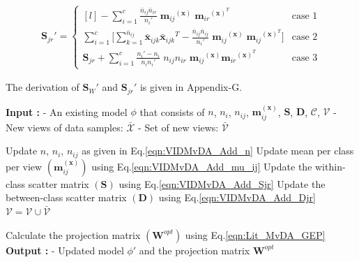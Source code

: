 \begin{equation}
\label{eqn:VIDMvDA_Add_Sjr}
\begin{split}
\textbf{S}_{jr}' = \left\{\begin{matrix*}[l]
- \sum\limits_{i=1}^{c} \frac{\bar{n}_{ij} \bar{n}_{ir}}{n_i'} \; {\textbf{m}_{ij}}^{(\textbf{x})} \; {\textbf{m}_{ir}}^{(\textbf{x})^T} & \text{case 1}
\\[0.4cm]
\sum\limits_{i=1}^{c} \bigg[ \sum\limits_{k=1}^{\bar{n}_{ij}} \bar{\textbf{x}}_{ijk} {\bar{\textbf{x}}_{ijk}}^T - \frac{\bar{n}_{ij} \bar{n}_{ij}}{n_i'} \; {\textbf{m}_{ij}}^{(\textbf{x})} \;{\textbf{m}_{ij}}^{(\textbf{x})^T} \bigg] & \text{case 2}
\\[0.4cm]
\textbf{S}_{jr} + \sum\limits_{i=1}^{c}  \frac{n_i' - n_i}{n_i n_i'} \; n_{ij} n_{ir} \; {\textbf{m}_{ij}}^{(\textbf{x})} {\textbf{m}_{ir}}^{(\textbf{x})^T} & \text{case 3}
\end{matrix*}\right.
\end{split}
\end{equation}

The derivation of $\textbf{S}_{W}'$ and $\textbf{S}_{jr}'$ is given in Appendix-G.%





\begin{algorithm}[t]
\centering
\caption{VIDMvDA: Incremental algorithm}
\label{VIDMvDA_Algo_Add}
    \begin{algorithmic}
	\STATE \textbf{Input :}
	\STATE - An existing model $\phi$ that consists of $n$, $n_i$, $n_{ij}$, $\textbf{m}_{ij}^{(\textbf{x})}$, $\textbf{S}$, $\textbf{D}$, $\mathcal{C}$, $\mathcal{V}$
	\STATE 		- New views of data samples: $\bar{\mathcal{X}}$
	\STATE 		- Set of new views: $\bar{\mathcal{V}}$ \vspace{0.1cm}

		
		\STATE \small Update $n$, $n_i$, $n_{ij}$ as given in Eq.\ref{eqn:VIDMvDA_Add_n}\;
		\STATE \small Update mean per class per view $(\textbf{m}_{ij}^{(\textbf{x})})$ using Eq.\ref{eqn:VIDMvDA_Add_mu_ij}\;
		\STATE \small Update the within-class scatter matrix $(\textbf{S})$ using Eq.\ref{eqn:VIDMvDA_Add_Sjr}\;
		\STATE \small Update the between-class scatter matrix $(\textbf{D})$ using Eq.\ref{eqn:VIDMvDA_Add_Djr}\;
		\STATE $\mathcal{V} = \mathcal{V} \cup \bar{\mathcal{V}}$ \;
			
		\STATE \small Calculate the projection matrix $(\textbf{W}^{opt})$ using Eq.\ref{eqn:Lit_MvDA_GEP}\;
	\ENDWHILE
	\STATE \textbf{Output :}
	\STATE - Updated model $\phi'$ and the projection matrix $\textbf{W}^{opt}$

\end{algorithmic}
\end{algorithm}





